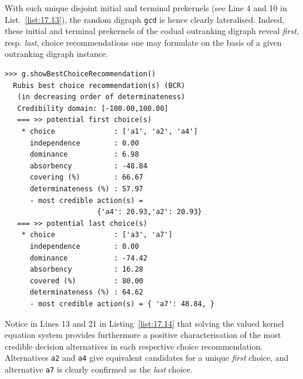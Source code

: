 With such unique disjoint initial and terminal prekernels (see Line 4 and 10 in List.~\vref{list:17.13}), the random digraph \texttt{gcd} is hence clearly lateralised. Indeed, these initial and terminal prekernels of the codual outranking digraph reveal \emph{first}, resp. \emph{last}, choice recommendations one may formulate on the basis of a given outranking digraph instance.
\begin{lstlisting}[caption={Computing a first and last choice recommendation from digraph \texttt{gcd}},label=list:17.14]
>>> g.showBestChoiceRecommendation()
  Rubis best choice recommendation(s) (BCR)
   (in decreasing order of determinateness)   
   Credibility domain: [-100.00,100.00]
   === >> potential first choice(s)
    * choice              : ['a1', 'a2', 'a4']
      independence        : 0.00
      dominance           : 6.98
      absorbency          : -48.84
      covering (%)        : 66.67
      determinateness (%) : 57.97
      - most credible action(s) =
                      {'a4': 20.93,'a2': 20.93}
   === >> potential last choice(s) 
    * choice              : ['a3', 'a7']
      independence        : 0.00
      dominance           : -74.42
      absorbency          : 16.28
      covered (%)         : 80.00
      determinateness (%) : 64.62
      - most credible action(s) = { 'a7': 48.84, }
\end{lstlisting}

Notice in Lines 13 and 21 in Listing~\vref{list:17.14} that solving the valued kernel equation system provides furthermore a positive characterisation of the most credible decision alternatives in each respective choice recommendation. Alternatives \texttt{a2} and \texttt{a4} give equivalent candidates for a unique \emph{first} choice, and alternative \texttt{a7} is clearly confirmed as the \emph{last} choice.

